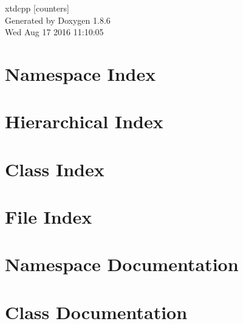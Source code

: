\documentclass[twoside]{book}
\newcommand{\clearemptydoublepage}{%
  \newpage{\pagestyle{empty}\cleardoublepage}%
}
\begin{document}
\hypersetup{pageanchor=false}
\begin{titlepage}
\vspace*{7cm}
\begin{center}%
{\Large xtdcpp \mbox{[}counters\mbox{]} }\\
\vspace*{1cm}
{\large Generated by Doxygen 1.8.6}\\
\vspace*{0.5cm}
{\small Wed Aug 17 2016 11:10:05}\\
\end{center}
\end{titlepage}
\clearemptydoublepage
\tableofcontents
\clearemptydoublepage
{}
\hypersetup{pageanchor=true}

\chapter{Namespace Index}

\chapter{Hierarchical Index}

\chapter{Class Index}

\chapter{File Index}

\chapter{Namespace Documentation}


\chapter{Class Documentation}

















\end{document}

